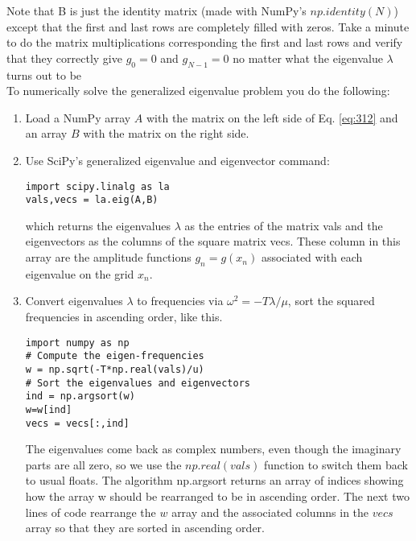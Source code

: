 Note that B is just the identity matrix (made with NumPy\rq s $np.identity(N)$)
except that the first and last rows are completely filled with zeros. Take a minute
to do the matrix multiplications corresponding the first and last rows and verify
that they correctly give $g_0 = 0$ and $g_{N - 1} = 0$ no matter what the eigenvalue $\lambda$ turns
out to be \\ 
	To numerically solve the generalized eigenvalue problem you do the following:
	\begin{enumerate}
		\item Load a NumPy array $A$ with the matrix on the left side of Eq. \ref{eq:312} and an
array $B$ with the matrix on the right side.
\item Use SciPy\rq s generalized eigenvalue and eigenvector command:
\begin{lstlisting}
import scipy.linalg as la
vals,vecs = la.eig(A,B)
\end{lstlisting}
which returns the eigenvalues $\lambda$ as the entries of the matrix vals and the
eigenvectors as the columns of the square matrix vecs. These column
in this array are the amplitude functions $g_n = g(x_n)$ associated with each
eigenvalue on the grid $x_n$.
\item Convert eigenvalues $\lambda$ to frequencies via $\omega^2 = - T \lambda/\mu$, sort the squared
frequencies in ascending order, like this.
\begin{lstlisting}
import numpy as np
# Compute the eigen-frequencies
w = np.sqrt(-T*np.real(vals)/u)
# Sort the eigenvalues and eigenvectors
ind = np.argsort(w)
w=w[ind]
vecs = vecs[:,ind]
\end{lstlisting}
The eigenvalues come back as complex numbers, even though the imaginary parts are all zero, so we use the $np.real(vals)$ function to switch
them back to usual floats. The algorithm np.argsort returns an array of
indices showing how the array w should be rearranged to be in ascending
order. The next two lines of code rearrange the $w$ array and the associated
columns in the $vecs$ array so that they are sorted in ascending order.


	\end{enumerate}
	
